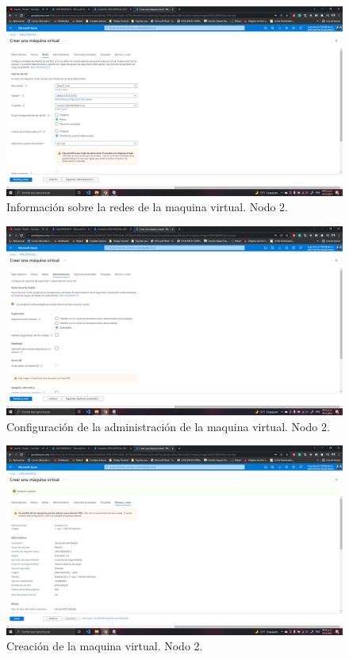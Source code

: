 \documentclass[11pt]{article}
\begin{document}
		\begin{figure}[H]
			\centering
			\includegraphics[scale=0.34]{resources/datosredes2.png}
			\caption{Información sobre la redes de la maquina virtual. Nodo 2.}\label{fig:picture}
		\end{figure}
		\begin{figure}[H]
			\centering
			\includegraphics[scale=0.34]{resources/datosadministracion2.png}
			\caption{Configuración de la administración de la maquina virtual. Nodo 2.}\label{fig:picture}
		\end{figure}
		\begin{figure}[H]
			\centering
			\includegraphics[scale=0.34]{resources/revisarycrear2.png}
			\caption{Creación de la maquina virtual. Nodo 2.}\label{fig:picture}
		\end{figure}
\end{document}
